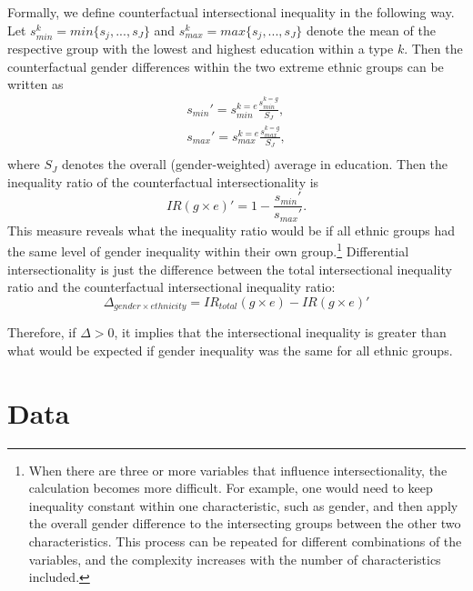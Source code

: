 
Formally, we define counterfactual intersectional inequality in the following way. Let $s_{min}^k = min\{s_j, ..., s_J\}$ and $s_{max}^k = max\{s_j, ..., s_J\}$ denote the mean of the respective group with the lowest and highest education within a type $k$. Then the counterfactual gender differences within the two extreme ethnic groups can be written as 
\begin{equation}
\begin{aligned}
    s_{min}' =  s_{min}^{k=e} \frac{s_{min}^{k=g}}{S_J} ,\\
s_{max}' =  s_{max}^{k=e} \frac{s_{max}^{k=g}}{S_J} ,\\
\end{aligned}
\end{equation}
where $S_J$ denotes the overall (gender-weighted) average in education. Then the inequality ratio of the counterfactual intersectionality is 
\begin{equation}
   IR(g \times e)' = 1-\frac{s_{min}'}{s_{max}'}. 
\end{equation}
This measure reveals what the inequality ratio would be if all ethnic groups had the same level of gender inequality within their own group.\footnote{When there are three or more variables that influence intersectionality, the calculation becomes more difficult. For example, one would need to keep inequality constant within one characteristic, such as gender, and then apply the overall gender difference to the intersecting groups between the other two characteristics. This process can be repeated for different combinations of the variables, and the complexity increases with the number of characteristics included.} Differential intersectionality is just the difference between the total intersectional inequality ratio and the counterfactual intersectional inequality ratio:
\begin{equation}
    \Delta_{gender\times ethnicity} = IR_{total}(g \times e) - IR(g \times e)'
\end{equation}

Therefore, if $\Delta > 0$, it implies that the intersectional inequality is greater than what would be expected if gender inequality was the same for all ethnic groups.
 
\hypertarget{data}{%
\section{Data}\label{data}}

